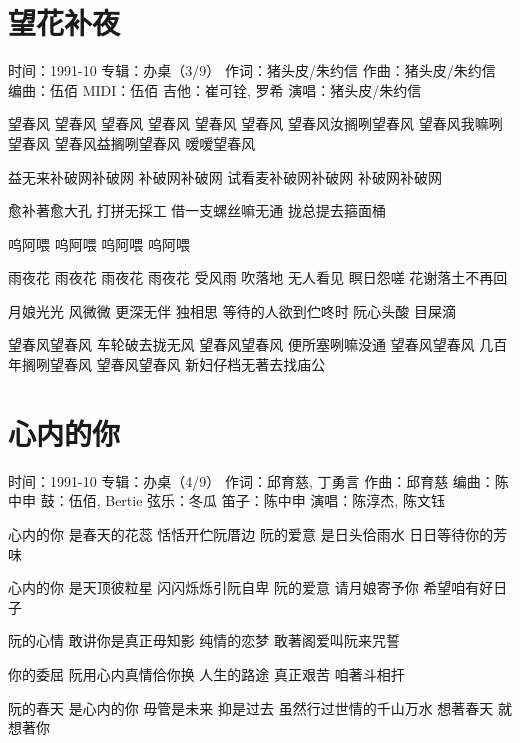\documentclass[UTF8,a4paper,oneside,twocolumn,12pt]{ctexbook}
\newcommand{\infopair}[2]{\textbullet #1：#2}
\newcommand{\zc}[1][伍佰]{\infopair{作词}{#1}}
\newcommand{\zq}[1][伍佰]{\infopair{作曲}{#1}}
\newcommand{\bq}[1][伍佰]{\infopair{编曲}{#1}}
\newcommand{\zj}[1]{\infopair{专辑}{#1}}
\newcommand{\sj}[1]{\infopair{时间}{#1}}
\newenvironment{info}{\begin{flushleft}\kaishu
	}
	{\end{flushleft}\normalsize\yahei\par}
\newenvironment{lyric}{
	}
{}
\begin{document}
\section{望花补夜}
\begin{info}
	\sj{1991-10}
	\zj{办桌（3/9）}
	\zc[猪头皮/朱约信]
	\zq[猪头皮/朱约信]
	\bq[伍佰]
	\infopair{MIDI}{伍佰}
	\infopair{吉他}{崔可铨, 罗希}
	\infopair{演唱}{猪头皮/朱约信}
\end{info}
\begin{lyric}
	望春风 望春风
	望春风 望春风
	望春风 望春风
	望春风汝搁咧望春风
	望春风我嘛咧望春风
	望春风益搁咧望春风
	嗳嗳望春风

	益无来补破网补破网
	补破网补破网
	试看麦补破网补破网
	补破网补破网

	愈补著愈大孔 打拼无採工
	借一支螺丝嘛无通
	拢总提去箍面桶

	呜阿喂 呜阿喂
	呜阿喂 呜阿喂

	雨夜花 雨夜花 雨夜花
	雨夜花 受风雨
	吹落地 无人看见
	瞑日怨嗟
	花谢落土不再回

	月娘光光 风微微
	更深无伴 独相思
	等待的人欲到伫咚时
	阮心头酸 目屎滴

	望春风望春风 车轮破去拢无风
	望春风望春风 便所塞咧嘛没通
	望春风望春风 几百年搁咧望春风
	望春风望春风 新妇仔档无著去找庙公
\end{lyric}

\section{心内的你}
\begin{info}
	\sj{1991-10}
	\zj{办桌（4/9）}
	\zc[邱育慈, 丁勇言]
	\zq[邱育慈]
	\bq[陈中申]
	\infopair{鼓}{伍佰, Bertie}
	\infopair{弦乐}{冬瓜}
	\infopair{笛子}{陈中申}
	\infopair{演唱}{陈淳杰, 陈文钰}
\end{info}
\begin{lyric}
	心内的你 是春天的花蕊
	恬恬开伫阮厝边
	阮的爱意 是日头佮雨水
	日日等待你的芳味

	心内的你 是天顶彼粒星
	闪闪烁烁引阮自卑
	阮的爱意 请月娘寄予你
	希望咱有好日子

	阮的心情 敢讲你是真正毋知影
	纯情的恋梦 敢著阁爱叫阮来咒誓

	你的委屈 阮用心内真情佮你换
	人生的路途 真正艰苦 咱著斗相扞

	阮的春天 是心内的你
	毋管是未来 抑是过去
	虽然行过世情的千山万水
	想著春天 就想著你
\end{lyric}
\end{document}
